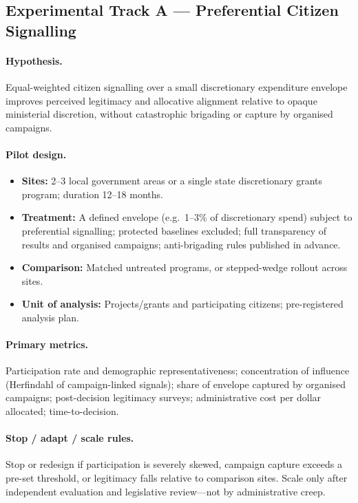 \documentclass[11pt,a4paper]{article}
\begin{document}
\subsection{Experimental Track A --- Preferential Citizen Signalling}

\paragraph{Hypothesis.}
Equal-weighted citizen signalling over a small discretionary expenditure envelope improves perceived legitimacy and allocative alignment relative to opaque ministerial discretion, without catastrophic brigading or capture by organised campaigns.

\paragraph{Pilot design.}
\begin{itemize}[leftmargin=*]
    \item \textbf{Sites:} 2--3 local government areas or a single state discretionary grants program; duration 12--18 months.
    \item \textbf{Treatment:} A defined envelope (e.g.\ 1--3\% of discretionary spend) subject to preferential signalling; protected baselines excluded; full transparency of results and organised campaigns; anti-brigading rules published in advance.
    \item \textbf{Comparison:} Matched untreated programs, or stepped-wedge rollout across sites.
    \item \textbf{Unit of analysis:} Projects/grants and participating citizens; pre-registered analysis plan.
\end{itemize}

\paragraph{Primary metrics.}
Participation rate and demographic representativeness; concentration of influence (Herfindahl of campaign-linked signals); share of envelope captured by organised campaigns; post-decision legitimacy surveys; administrative cost per dollar allocated; time-to-decision.

\paragraph{Stop / adapt / scale rules.}
Stop or redesign if participation is severely skewed, campaign capture exceeds a pre-set threshold, or legitimacy falls relative to comparison sites. Scale only after independent evaluation and legislative review---not by administrative creep.
\end{document}

